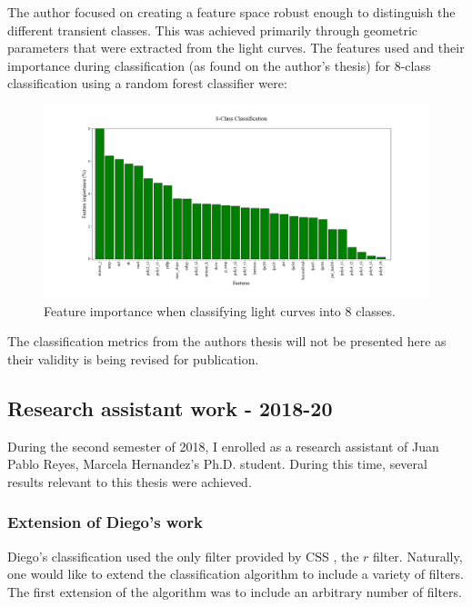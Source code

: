 The author focused on creating a feature space robust enough to distinguish the different transient classes. This was achieved primarily through geometric parameters that were extracted from the light curves. The features used and their importance during classification (as found on the author's thesis) for 8-class classification using a random forest classifier were: 

\begin{figure}[H]
  \centering
  \includegraphics[width=1.05\textwidth]{images/importances.png}
  \caption{Feature importance when classifying light curves into 8 classes.}
\end{figure}

The classification metrics from the authors thesis will not be presented here as their validity is being revised for publication.

\subsection{Research assistant work - 2018-20}

During the second semester of 2018, I enrolled as a research assistant of Juan Pablo Reyes, Marcela Hernandez's Ph.D. student. During this time, several results relevant to this thesis were achieved. 

\subsubsection{Extension of Diego's work}\label{improvementDiego}

Diego's classification used the only filter provided by CSS \cite{catalina}, the $r$ filter. Naturally, one would like to extend the classification algorithm to include a variety of filters. The first extension of the algorithm was to include an arbitrary number of filters. \\

